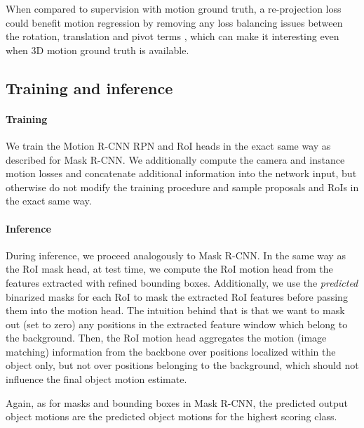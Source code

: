 When compared to supervision with motion ground truth, a re-projection
loss could benefit motion regression by removing any loss balancing issues between the
rotation, translation and pivot terms \cite{PoseNet2},
which can make it interesting even when 3D motion ground truth is available.

\subsection{Training and inference}
\label{ssec:training_inference}
\paragraph{Training}
We train the Motion R-CNN RPN and RoI heads in the exact same way as described for Mask R-CNN.
We additionally compute the camera and instance motion losses and concatenate additional
information into the network input, but otherwise do not modify the training procedure
and sample proposals and RoIs in the exact same way.

\paragraph{Inference}
During inference, we proceed analogously to Mask R-CNN.
In the same way as the RoI mask head, at test time, we compute the RoI motion head
from the features extracted with refined bounding boxes.
Additionally, we use the \emph{predicted} binarized masks for each RoI to mask the
extracted RoI features before passing them into the motion head.
The intuition behind that is that we want to mask out (set to zero) any positions in the
extracted feature window which belong to the background. Then, the RoI motion
head aggregates the motion (image matching) information from the backbone
over positions localized within the object only, but not over positions belonging
to the background, which should not influence the final object motion estimate.

Again, as for masks and bounding boxes in Mask R-CNN,
the predicted output object motions are the predicted object motions for the
highest scoring class.

